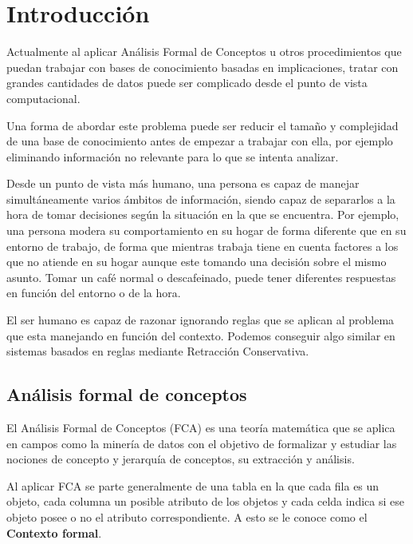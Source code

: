 
\chapter*{Introducción}


	Actualmente al aplicar Análisis Formal de Conceptos u otros procedimientos que puedan 
	trabajar con bases de conocimiento basadas en implicaciones, tratar con grandes cantidades 
	de datos puede ser complicado desde el punto de vista computacional.
	
	Una forma de abordar este problema puede ser reducir el tamaño y complejidad de una base 
	de conocimiento antes de empezar a trabajar con ella, por ejemplo eliminando información no 
	relevante para lo que se intenta analizar.   
	
	Desde un punto de vista más humano, una persona es capaz de manejar simultáneamente varios
	ámbitos de información, siendo capaz de separarlos a la hora de tomar decisiones según la 
	situación en la que se encuentra. Por ejemplo, una persona modera su comportamiento en su hogar
	de forma diferente que en su entorno de trabajo, de forma que mientras trabaja tiene en cuenta factores
	a los que no atiende en su hogar aunque este tomando una decisión sobre el mismo asunto. Tomar un café 
	normal o descafeinado, puede tener diferentes respuestas en función del entorno o de la hora.
	
	El ser humano es capaz de razonar ignorando reglas que se aplican al problema que esta manejando en función del contexto. Podemos conseguir
	algo similar en sistemas basados en reglas mediante Retracción Conservativa.


\section*{Análisis formal de conceptos}

	El Análisis Formal de Conceptos (FCA) es una teoría matemática que se aplica en campos como la minería de datos con el objetivo de formalizar y estudiar las nociones de concepto y jerarquía de conceptos, su extracción y análisis.
	
	Al aplicar FCA se parte generalmente de una tabla en la que cada fila es un objeto, cada columna un posible atributo de los objetos y cada celda indica si ese objeto posee o no el atributo correspondiente. A esto se le conoce como el \textbf{Contexto formal}.
	
